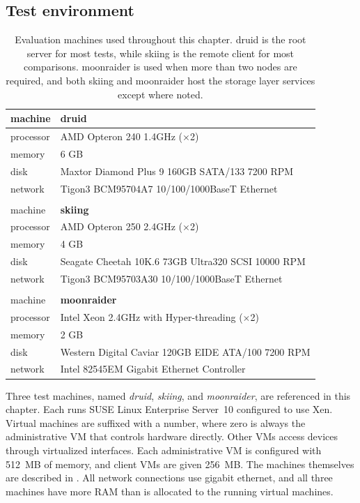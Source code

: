 \subsection{Test environment}

\begin{table}[t]
\begin{center}
\begin{tabular}{l|l}
machine      & \textbf{druid} \\ \hline
processor    & AMD Opteron 240 1.4GHz ($\times$2) \\
memory       & 6 GB \\
disk         & Maxtor Diamond Plus 9 160GB SATA/133 7200 RPM \\
network      & Tigon3 BCM95704A7 10/100/1000BaseT Ethernet \\
& \\
machine      & \textbf{skiing} \\ \hline
processor    & AMD Opteron 250 2.4GHz ($\times$2) \\
memory       & 4 GB \\
disk         & Seagate Cheetah 10K.6 73GB Ultra320 SCSI 10000 RPM \\
network      & Tigon3 BCM95703A30 10/100/1000BaseT Ethernet \\
& \\
machine      & \textbf{moonraider} \\ \hline
processor    & Intel Xeon 2.4GHz with Hyper-threading ($\times$2) \\
memory       & 2 GB \\
disk         & Western Digital Caviar 120GB EIDE ATA/100 7200 RPM \\
network      & Intel 82545EM Gigabit Ethernet Controller
\end{tabular}
\end{center}
\caption[Machines used in the evaluation]{Evaluation machines used throughout this chapter. druid is the root server for most tests, while skiing is the remote client for most comparisons. moonraider is used when more than two nodes are required, and both skiing and moonraider host the storage layer services except where noted.}
\label{tab:hardware}
\end{table}

Three test machines, named \emph{druid}, \emph{skiing}, and \emph{moonraider}, are referenced in this chapter. Each runs SUSE Linux Enterprise Server~10 configured to use Xen. Virtual machines are suffixed with a number, where zero is always the administrative VM that controls hardware directly. Other VMs access devices through virtualized interfaces. Each administrative VM is configured with 512~MB of memory, and client VMs are given 256~MB. The machines themselves are described in . All network connections use gigabit ethernet, and all three machines have more RAM than is allocated to the running virtual machines.

